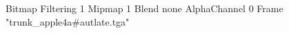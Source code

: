 {Bitmap
	{Filtering 1}
	{Mipmap 1}
	{Blend none}
	{AlphaChannel 0}
	{Frame "trunk_apple4a#autlate.tga"}
}
